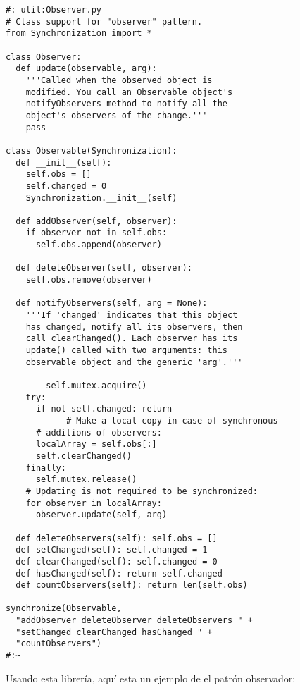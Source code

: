 \begin{lstlisting} 
#: util:Observer.py 
# Class support for "observer" pattern. 
from Synchronization import * 

class Observer: 
  def update(observable, arg): 
    '''Called when the observed object is  
    modified. You call an Observable object's  
    notifyObservers method to notify all the  
    object's observers of the change.''' 
    pass 
    
class Observable(Synchronization): 
  def __init__(self): 
    self.obs = [] 
    self.changed = 0 
    Synchronization.__init__(self) 
    
  def addObserver(self, observer): 
    if observer not in self.obs: 
      self.obs.append(observer) 
      
  def deleteObserver(self, observer): 
    self.obs.remove(observer) 
    
  def notifyObservers(self, arg = None): 
    '''If 'changed' indicates that this object  
    has changed, notify all its observers, then  
    call clearChanged(). Each observer has its  
    update() called with two arguments: this  
    observable object and the generic 'arg'.''' 
    
        self.mutex.acquire() 
    try: 
      if not self.changed: return
            # Make a local copy in case of synchronous 
      # additions of observers: 
      localArray = self.obs[:] 
      self.clearChanged() 
    finally: 
      self.mutex.release() 
    # Updating is not required to be synchronized: 
    for observer in localArray: 
      observer.update(self, arg) 
      
  def deleteObservers(self): self.obs = [] 
  def setChanged(self): self.changed = 1 
  def clearChanged(self): self.changed = 0 
  def hasChanged(self): return self.changed 
  def countObservers(self): return len(self.obs) 
  
synchronize(Observable,  
  "addObserver deleteObserver deleteObservers " + 
  "setChanged clearChanged hasChanged " + 
  "countObservers") 
#:~ 
\end{lstlisting}

Usando esta librería, aquí esta un ejemplo de el patrón  observador:\newline

